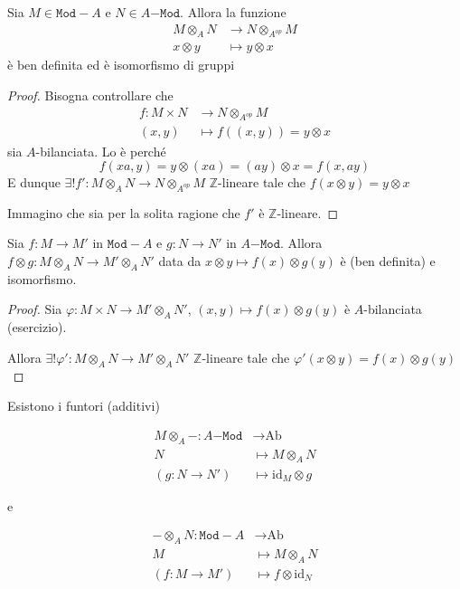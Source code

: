 \begin{proposition}{}
    Sia \(M \in \mathtt{Mod-}A\) e \(N \in A\mathtt{-Mod}\). Allora la funzione
    \begin{align*}
        M \otimes_A N &\to N \otimes_{A^{op}} M \\
        x \otimes y & \mapsto y \otimes x
    \end{align*}
    è ben definita ed è isomorfismo di gruppi
\end{proposition}
\begin{proof}{}
    Bisogna controllare che \begin{align*}
        f: M \times N &\longrightarrow N \otimes_{A^{op}} M \\
        {(x,y)} &\longmapsto f({(x,y)}) = y \otimes x
    \end{align*}
    sia \(A\)-bilanciata. Lo è perché
    \[
      f{(xa, y)} = y \otimes {(xa)} = {(ay)} \otimes x = f{(x, ay)}
    \]
    E dunque \(\exists ! f' : M \otimes_A N \to N \otimes_{A^{op}} M\)
    \(\mathbb{Z}\)-lineare tale che \(f{(x \otimes y)} = y \otimes x\) 

    Immagino che sia per la solita ragione che \(f'\) è \(\mathbb{Z}\)-lineare. %
\end{proof}

\begin{proposition}{}
    Sia \(f : M \to M'\) in \(\mathtt{Mod-}A\) e \(g: N \to N'\) in
    \(A\mathtt{-Mod}\). Allora \(f \otimes g : M \otimes_A N \to M' \otimes_A
    N'\) data da \(x \otimes y \mapsto f{(x)} \otimes g{(y)}\) è (ben definita)
    e isomorfismo.
\end{proposition}
\begin{proof}{}
    Sia \(\varphi : M \times N \to M' \otimes_A N'\), \({(x,y)} \mapsto
    f{(x)} \otimes g{(y)}\)  è \(A\)-bilanciata
    (esercizio). %

    Allora \(\exists ! \varphi ' : M \otimes_A N \to M' \otimes_A N'\)
    \(\mathbb{Z}\)-lineare tale che \(\varphi'{(x \otimes y)} = f{(x)} \otimes
    g{(y)}\) 
\end{proof}
\begin{corollary}{} Esistono i funtori (additivi) \\
\begin{minipage}{0.48\textwidth}
    \begin{align*}
        M\otimes_A -: A\mathtt{-Mod} &\longrightarrow \text{Ab} \\
        N &\longmapsto  M \otimes_A N \\
        (g : N \to N') &\longmapsto \mathrm{id}_M \otimes g
    \end{align*}
\end{minipage}
e
\hfill
\begin{minipage}{0.48\textwidth}
    \begin{align*}
        - \otimes_A N: \mathtt{Mod-}A &\longrightarrow \text{Ab} \\
        M &\longmapsto M \otimes_A N \\
        (f : M \to M') &\longmapsto f \otimes \mathrm{id}_N
    \end{align*}
\end{minipage}
\end{corollary}

